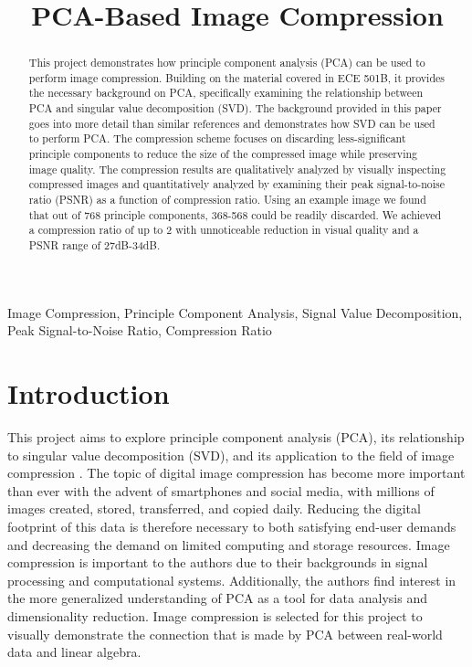 \documentclass[conference]{IEEEtran}
\title{PCA-Based Image Compression}
\author{
\IEEEauthorblockN{Owen Sowatzke}
\IEEEauthorblockA{\textit{Electrical Engineering Department} \\
\textit{University of Arizona}\\
Tucson, USA \\
osowatzke@arizona.edu}
\and
\IEEEauthorblockN{Scott Thoesen}
\IEEEauthorblockA{\textit{Electrical Engineering Department} \\
\textit{University of Arizona}\\
Tucson, USA \\
thoesens@arizona.edu}}
\begin{document}
    
	\maketitle
	\begin{abstract}
		This project demonstrates how principle component analysis (PCA) can be used to perform image compression. Building on the material covered in ECE 501B, it provides the necessary background on PCA, specifically examining the relationship between PCA and singular value decomposition (SVD). The background provided in this paper goes into more detail than similar references and demonstrates how SVD can be used to perform PCA. The compression scheme focuses on discarding less-significant principle components to reduce the size of the compressed image while preserving image quality. The compression results are qualitatively analyzed by visually inspecting compressed images and quantitatively analyzed by examining their peak signal-to-noise ratio (PSNR) as a function of compression ratio. Using an example image we found that out of 768 principle components, 368-568 could be readily discarded. We achieved a compression ratio of up to 2 with unnoticeable reduction in visual quality and a PSNR range of 27dB-34dB.
	\end{abstract}

	\begin{IEEEkeywords}
		Image Compression, Principle Component Analysis, Signal Value Decomposition, Peak Signal-to-Noise Ratio, Compression Ratio
	\end{IEEEkeywords}

    \section{Introduction}
    This project aims to explore principle component analysis (PCA), its relationship to singular value decomposition (SVD), and its application to the field of image compression \cite{jaradet_svd_image_compression}. The topic of digital image compression has become more important than ever with the advent of smartphones and social media, with millions of images created, stored, transferred, and copied daily. Reducing the digital footprint of this data is therefore necessary to both satisfying end-user demands and decreasing the demand on limited computing and storage resources. Image compression is important to the authors due to their backgrounds in signal processing and computational systems. Additionally, the authors find interest in the more generalized understanding of PCA as a tool for data analysis and dimensionality reduction. Image compression is selected for this project to visually demonstrate the connection that is made by PCA between real-world data and linear algebra.
\end{document}
